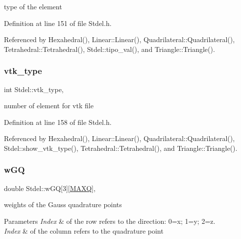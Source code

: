 type of the element 



Definition at line 151 of file Stdel.\+h.



Referenced by Hexahedral(), Linear\+::\+Linear(), Quadrilateral\+::\+Quadrilateral(), Tetrahedral\+::\+Tetrahedral(), Stdel\+::tipo\+\_\+val(), and Triangle\+::\+Triangle().

\mbox{\label{classStdel_a55624584790a08437c03540489d04898}} 
\subsubsection{\texorpdfstring{vtk\+\_\+type}{vtk\_type}}
{\footnotesize\ttfamily int Stdel\+::vtk\+\_\+type\hspace{0.3cm}{\ttfamily [protected]}, {\ttfamily [inherited]}}



number of element for vtk file 



Definition at line 158 of file Stdel.\+h.



Referenced by Hexahedral(), Linear\+::\+Linear(), Quadrilateral\+::\+Quadrilateral(), Stdel\+::show\+\_\+vtk\+\_\+type(), Tetrahedral\+::\+Tetrahedral(), and Triangle\+::\+Triangle().

\mbox{\label{classStdel_af99d72cbda49c30e23e83705c95a1c5b}} 
\subsubsection{\texorpdfstring{w\+GQ}{wGQ}}
{\footnotesize\ttfamily double Stdel\+::w\+GQ\mbox{[}3\mbox{]}\mbox{[}\hyperlink{MyOptions_8h_af708e94d886ba3f59582612949cac702}{M\+A\+XQ}\mbox{]}\hspace{0.3cm}{\ttfamily [protected]}, {\ttfamily [inherited]}}

weights of the Gauss quadrature points 
\begin{DoxyParams}{Parameters}
{\em Index} & of the row refers to the direction\+: 0=x; 1=y; 2=z. \\
\hline
{\em Index} & of the column refers to the quadrature point \\
\hline
\end{DoxyParams}


